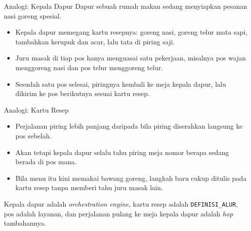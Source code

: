 \documentclass[aspectratio=169, table, 12pt]{beamer}
\begin{document}
\begin{frame}{{\Large Analogi: Kepala Dapur}}
  \vspace{10pt}
  {\small Dapur sebuah rumah makan sedang menyiapkan pesanan nasi goreng
  spesial.}

  \vspace{6pt}
  \begin{itemize}\small
    \item Kepala dapur memegang kartu resepnya: goreng nasi, goreng telur mata
          sapi, tambahkan kerupuk dan acar, lalu tata di piring saji.
    \item Juru masak di tiap pos hanya menguasai satu pekerjaan, misalnya pos
          wajan menggoreng nasi dan pos telur menggoreng telur.
    \item Sesudah satu pos selesai, piringnya kembali ke meja kepala dapur, lalu
          dikirim ke pos berikutnya sesuai kartu resep.
  \end{itemize}
\end{frame}

\begin{frame}{{\Large Analogi: Kartu Resep}}
  \vspace{10pt}
  \begin{itemize}\small
    \item Perjalanan piring lebih panjang daripada bila piring diserahkan
          langsung ke pos sebelah.
    \item Akan tetapi kepala dapur selalu tahu piring meja nomor berapa sedang
          berada di pos mana.
    \item Bila menu itu kini memakai bawang goreng, langkah baru cukup ditulis
          pada kartu resep tanpa memberi tahu juru masak lain.
  \end{itemize}

  \vspace{8pt}
  {\small Kepala dapur adalah \textit{orchestration engine}, kartu resep adalah
  \texttt{DEFINISI\_ALUR}, pos adalah layanan, dan perjalanan pulang ke meja
  kepala dapur adalah \textit{hop} tambahannya.}
\end{frame}
\end{document}
